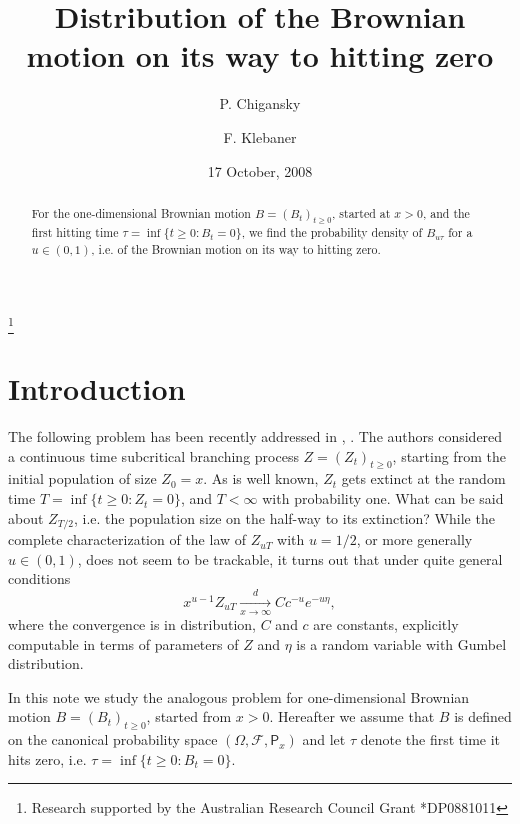 \documentclass[reqno,10pt]{amsart}
\theoremstyle{definition}
\theoremstyle{remark}
\numberwithin{equation}{section}
\begin{document}
\title[]{Distribution of the Brownian motion on its way to hitting zero}\author{P. Chigansky}\address{Department of Statistics,
The Hebrew University,
Mount Scopus, Jerusalem 91905,
Israel}

\author{F. Klebaner}
\address{ School of Mathematical Sciences,
Monash University Vic 3800,
Australia}

\thanks{Research supported by the Australian Research Council Grant  *DP0881011}

\date{17 October,  2008}\begin{abstract}
For the one-dimensional Brownian motion $B=(B_t)_{t\ge 0}$, started at $x>0$, and the  first hitting time
$\tau=\inf\{t\ge 0:B_t=0\}$, we find the probability density of $B_{u\tau}$ for a $u\in(0,1)$, i.e. of
 the Brownian motion on its way to hitting zero.
\end{abstract}
\maketitle

\section{Introduction}
The following problem has been recently addressed in \cite{JKS07a},
\cite{JKS07b}. The authors considered a continuous time subcritical
branching process $Z=(Z_t)_{t\ge 0}$, starting from the  initial
population of size $Z_0=x$. As is well known, $Z_t$ gets extinct at
the random time $T=\inf\{t\ge 0:Z_t=0\}$, and $T<\infty$ with
probability one. What can be said about $Z_{T/2}$, i.e. the
population size on the half-way to its extinction? While the
complete characterization of the law of $Z_{uT}$ with $u=1/2$, or
more generally $u\in(0,1)$, does not seem to be trackable, it turns
out that under quite general conditions
\begin{equation}
\label{JKS}
x^{u-1} Z_{uT} \xrightarrow[x\to \infty]{d} C c^{-u}e^{-u\eta},
\end{equation}
where the convergence is in distribution, $C$ and $c$ are constants,
explicitly computable in terms of parameters of $Z$ and $\eta$ is a
random variable with Gumbel distribution.

In this note we study the analogous problem for one-dimensional
Brownian motion $B=(B_t)_{t\ge 0}$, started from $x>0$. Hereafter we
assume that $B$ is defined on the canonical probability space
$(\Omega,{\mathcal{F}},{\mathsf{P}}_x)$ and  let $\tau$ denote the first time it hits
zero, i.e. $\tau=\inf\{t\ge 0: B_t=0\}$.
\end{document}

